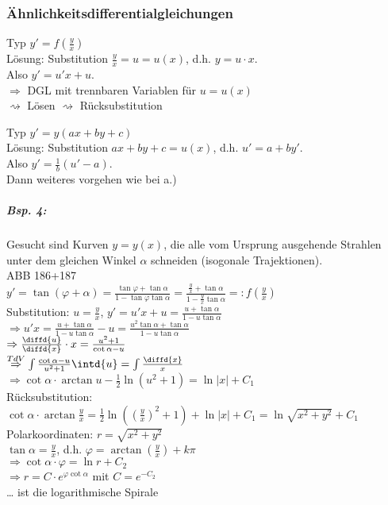 \subsubsection{Ähnlichkeitsdifferentialgleichungen}
\begin{anumerate}
\item Typ $\boxed{y'=f\left(\frac{y}{x}\right)}$\\
Lösung: Substitution $\frac{y}{x}=u=u(x)$, d.h. $y=u\cdot x$.\\
Also $y'=u'x+u$.\\
$\Rightarrow $ DGL mit trennbaren Variablen für $u=u(x)$\\
$\rightsquigarrow$ Lösen $\rightsquigarrow$ Rücksubstitution
\item Typ $\boxed{y'=y(ax+by+c)}$\\
Lösung: Substitution $ax+by+c=u(x)$, d.h. $u'=a+by'$.\\
Also $y'=\frac{1}{b}(u'-a)$.\\
Dann weiteres vorgehen wie bei a.)
\end{anumerate}
\subparagraph{Bsp. 4:} Gesucht sind Kurven $y=y(x)$, die alle vom Ursprung ausgehende Strahlen unter dem gleichen Winkel $\alpha$ schneiden (isogonale Trajektionen).\\
ABB 186+187\\
$y'=\tan (\varphi+\alpha)=\frac{\tan \varphi + \tan \alpha}{1-\tan \varphi \tan \alpha}=\frac{\frac{y}{x}+\tan \alpha}{1-\frac{y}{x}\tan \alpha}=:f\left(\frac{y}{x}\right)$\\
Substitution: $u=\frac{y}{x}$, $y'=u'x+u=\frac{u+\tan \alpha}{1-u\tan \alpha}$\\
$\Rightarrow u'x=\frac{u+\tan \alpha}{1-u\tan \alpha}-u=\frac{u^2\tan \alpha + \tan \alpha}{1-u\tan \alpha}$\\
$\Rightarrow \frac{\diffd{u}}{\diffd{x}}\cdot x = \frac{u^2+1}{\cot \alpha -u}$\\
$\overset{TdV}{\Rightarrow} \int \frac{\cot \alpha -u}{u^2+1}\intd{u}=\int \frac{\diffd{x}}{x}$\\
$\Rightarrow \cot \alpha \cdot \arctan u - \frac{1}{2}\ln(u^2+1)=\ln|x| + C_1$\\
Rücksubstitution: $\cot \alpha \cdot \arctan \frac{y}{x}=\frac{1}{2}\ln\left(\left(\frac{y}{x}\right)^2+1\right) + \ln|x| + C_1=\ln \sqrt{x^2+y^2}+C_1$\\
Polarkoordinaten: $r=\sqrt{x^2+y^2}$\\
$\tan \alpha = \frac{y}{x}$, d.h. $\varphi = \arctan \left( \frac{y}{x}\right)+k\pi$\\
$\Rightarrow \cot \alpha \cdot \varphi = \ln r + C_2$\\
$\Rightarrow r = C\cdot e^{\varphi \cot\alpha}$ mit $C=e^{-C_2}$\\
… ist die logarithmische Spirale
